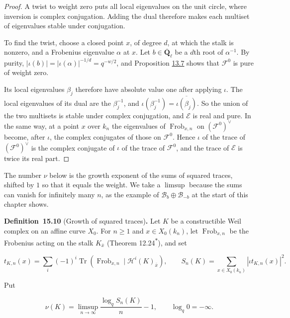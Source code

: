 \documentclass[11pt]{article}
\newenvironment{bpstatement}[2]{\par\addvspace{0.6\baselineskip}\noindent\textbf{#1}#2\textbf{.}\enspace\ignorespaces}
  {\par\addvspace{0.4\baselineskip}}
\newcommand{\bpout}[1]{#1\textsuperscript{\hyperlink{bp-outside}{\ensuremath{\ast}}}}
\begin{document}
\begin{proof}[{Proof}]\label{bp149}%
A twist to weight zero puts all local eigenvalues on the unit circle, where inversion is complex conjugation. Adding the dual therefore makes each multiset of eigenvalues stable under conjugation.

To find the twist, choose a closed point \(x\), of degree \(d\), at which the stalk is nonzero, and a Frobenius eigenvalue \(\alpha\) at \(x\).  Let \(b\in\overline{\mathbf Q}_\ell\) be a \(d\)th root of \(\alpha^{-1}\).  By purity, \(|\iota(b)|=|\iota(\alpha)|^{-1/d}=q^{-w/2}\), and Proposition \hyperref[bp24]{13.7} shows that \(\mathcal F^0\) is pure of weight zero.

Its local eigenvalues \(\beta_j\) therefore have absolute value one after applying \(\iota\). The local eigenvalues of its dual are the \(\beta_j^{-1}\), and \(\iota(\beta_j^{-1})=\overline{\iota(\beta_j)}\). So the union of the two multisets is stable under complex conjugation, and \(\mathcal E\) is real and pure. In the same way, at a point \(x\) over \(k_n\) the eigenvalues of \(\operatorname{Frob}_{x,n}\) on \((\mathcal F^0)^\vee\) become, after \(\iota\), the complex conjugates of those on \(\mathcal F^0\). Hence \(\iota\) of the trace of \((\mathcal F^0)^\vee\) is the complex conjugate of \(\iota\) of the trace of \(\mathcal F^0\), and the trace of \(\mathcal E\) is twice its real part.
\end{proof}

\label{bp150}%
The number \(\nu\) below is the growth exponent of the sums of squared traces, shifted by \(1\) so that it equals the weight. We take a \(\limsup\) because the sums can vanish for infinitely many \(n\), as the example of \(\mathcal B_b\oplus\mathcal B_{-b}\) at the start of this chapter shows.

\label{bp151}%
\begin{bpstatement}{Definition~15.10}{ (Growth of squared traces)}
Let \(K\) be a constructible Weil complex on an affine curve \(X_0\). For \(n\ge1\) and \(x\in X_0(k_n)\), let \(\operatorname{Frob}_{x,n}\) be the Frobenius acting on the stalk \(K_{\bar x}\) (Theorem \bpout{12.24}), and set

\[
t_{K,n}(x)=\sum_i(-1)^i\operatorname{Tr}
(\operatorname{Frob}_{x,n}\mid\mathcal H^i(K)_{\bar x}),\qquad
S_n(K)=\sum_{x\in X_0(k_n)}|\iota t_{K,n}(x)|^2.
\]

Put

\[
\nu(K)=\limsup_{n\to\infty}\frac{\log_q S_n(K)}n-1,
\qquad \log_q0=-\infty.
\]
\end{bpstatement}
\end{document}
